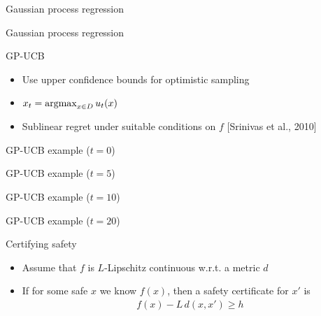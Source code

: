 \documentclass[xetex,10pt,mathserif,handout]{beamer}
\newlength\figureheight
\newlength\figurewidth
\newcommand{\qcite}[1]{{\small\color{gray}[#1]}}
\begin{document}
\begin{frame}{Gaussian process regression}
\centering
\setlength\figurewidth{5in}
\setlength\figureheight{3.5in}

\end{frame}

\begin{frame}{Gaussian process regression}
\centering
\setlength\figurewidth{5in}
\setlength\figureheight{3.5in}

\end{frame}

\begin{frame}{GP-UCB}
\begin{itemize}
\item<1-> Use upper confidence bounds for optimistic sampling
\vspace{1em}
\item<2-> $x_t = \argmax_{x \in D}u_t(x)$\\[1em]
  \centering
  \setlength\figurewidth{4in}
  \setlength\figureheight{2.5in}
  
\vspace{0.5em}
\item<3-> Sublinear regret under suitable conditions on $f$ \qcite{Srinivas et al., 2010}
\end{itemize}
\end{frame}

\begin{frame}{GP-UCB example ($t = 0$)}
\centering
\setlength\figurewidth{5in}
\setlength\figureheight{3.5in}

\end{frame}

\begin{frame}{GP-UCB example ($t = 5$)}
\centering
\setlength\figurewidth{5in}
\setlength\figureheight{3.5in}

\end{frame}

\begin{frame}{GP-UCB example ($t = 10$)}
\centering
\setlength\figurewidth{5in}
\setlength\figureheight{3.5in}

\end{frame}

\begin{frame}{GP-UCB example ($t = 20$)}
\centering
\setlength\figurewidth{5in}
\setlength\figureheight{3.5in}

\end{frame}

\begin{frame}{Certifying safety}
\begin{itemize}
\item<1-> Assume that $f$ is $L$-Lipschitz continuous w.r.t. a metric $d$
\vspace{2em}
\item<2-> If for some safe $x$ we know $f(x)$, then a safety certificate for $x'$ is
\begin{align*}
f(x) - L\,d(x, x') \geq h
\end{align*}
\end{itemize}
\end{frame}
\end{document}
